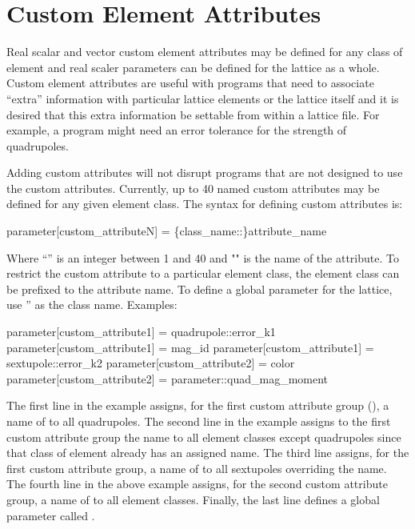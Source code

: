{{{{{\newpage

\section{Custom Element Attributes}
\label{s:cust.att}

Real scalar and vector custom element attributes may be defined for any class of element and real
scaler parameters can be defined for the lattice as a whole.  Custom element attributes are useful
with programs that need to associate ``extra'' information with particular lattice elements or the
lattice itself and it is desired that this extra information be settable from within a lattice
file. For example, a program might need an error tolerance for the strength of quadrupoles.

Adding custom attributes will not disrupt programs that are not designed to use the custom
attributes. Currently, up to 40 named custom attributes may be defined for any given element
class. The syntax for defining custom attributes is:
\begin{example}
  parameter[custom_attributeN] = \{class_name::\}attribute_name
\end{example}
Where ``'' is an integer between 1 and 40 and "" is the name of the
attribute. To restrict the custom attribute to a particular element class, the element class can be
prefixed to the attribute name. To define a global parameter for the lattice, use ''
as the class name.
Examples:
\begin{example}
  parameter[custom_attribute1] = quadrupole::error_k1
  parameter[custom_attribute1] = mag_id
  parameter[custom_attribute1] = sextupole::error_k2
  parameter[custom_attribute2] = color
  parameter[custom_attribute2] = parameter::quad_mag_moment
\end{example}
The first line in the example assigns, for the first custom attribute group
(), a name of  to all quadrupoles. The second line in the example
assigns to the first custom attribute group the name  to all element classes except
quadrupoles since that class of element already has an assigned name. The third line assigns, for
the first custom attribute group, a name of  to all sextupoles overriding the
 name. The fourth line in the above example assigns, for the second custom attribute
group, a name of  to all element classes. Finally, the last line defines a global parameter
called .

}}}}}
